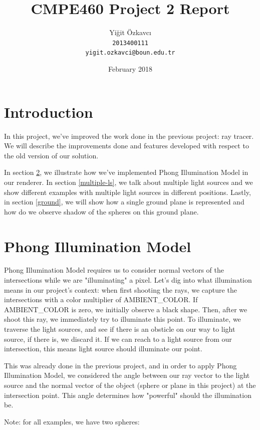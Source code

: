 \documentclass{article}
\title{CMPE460 Project 2 Report}
\author{
  Yiğit Özkavcı \\
  \texttt{2013400111} \\
  \texttt{yigit.ozkavci@boun.edu.tr}
}
\date{February 2018}
\begin{document}
\maketitle

\tableofcontents

\section{Introduction}

In this project, we've improved the work done in the previous project: ray tracer. We will describe the improvements done and features developed with respect to the old version of our solution.

In section \ref{phong}, we illustrate how we've implemented Phong Illumination Model in our renderer. In section \ref{multiple-ls}, we talk about multiple light sources and we show different examples with multiple light sources in different positions. Lastly, in section \ref{ground}, we will show how a single ground plane is represented and how do we observe shadow of the spheres on this ground plane.

\newpage

\section{Phong Illumination Model}
\label{phong}

Phong Illumination Model requires us to consider normal vectors of the intersections while we are "illuminating" a pixel. Let's dig into what illumination means in our project's context: when first shooting the rays, we capture the intersections with a color multiplier of AMBIENT\_COLOR. If AMBIENT\_COLOR is zero, we initially observe a black shape. Then, after we shoot this ray, we immediately try to illuminate this point. To illuminate, we traverse the light sources, and see if there is an obsticle on our way to light source, if there is, we discard it. If we can reach to a light source from our intersection, this means light source should illuminate our point.

This was already done in the previous project, and in order to apply Phong Illumination Model, we considered the angle between our ray vector to the light source and the normal vector of the object (sphere or plane in this project) at the intersection point. This angle determines how "powerful" should the illumination be.

Note: for all examples, we have two spheres:
\end{document}
